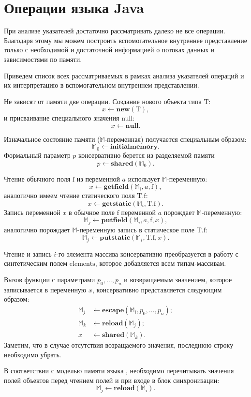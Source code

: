 \documentclass[14pt,titlepage,draft]{extarticle}
\newcommand{\java}{\eng{Java}\xspace}
\newcommand{\M}{\mathbb{M}}
\newcommand{\Mhyp}{$\M$\hyp}
\newcommand{\type}[1]{\mathrm{#1}}
\newcommand{\field}[1]{\mathrm{#1}}
\newcommand{\sfield}[2]{\type{#1}.\field{#2}}
\newcommand{\op}[1]{\mathbf{#1}}
\begin{document}
  \section{Операции языка Java}

    При анализе указателей достаточно рассматривать далеко не все операции.
    Благодаря этому мы можем построить вспомогательное внутреннее представление
    только с необходимой и достаточной информацией о потоках данных и
    зависимостями по памяти.

    Приведем список всех рассматриваемых в рамках анализа указателей операций и
    их интерпретацию в вспомогательном внутреннем представлении.

    Не зависят от памяти две операции. Создание нового объекта типа $\type{T}$:
    \[ x \gets \op{new}(\type{T}), \]
    и присваивание специального значения null:
    \[ x \gets \op{null}. \]

    Изначальное состояние памяти (\Mhyp переменная) получается специальным
    образом:
    \[ \M_0 \gets \op{initialmemory}. \]
    Формальный параметр $p$ консервативно берется из разделяемой памяти
    \[ p \gets \op{shared}(\M_0). \]

    Чтение обычного поля $\field{f}$ из переменной $a$ использует
    \Mhyp переменную:
    \[ x \gets \op{getfield}(\M_i, a, \field{f}), \]
    аналогично имеем чтение статического поля $\sfield{T}{f}$:
    \[ x \gets \op{getstatic}(\M_i, \sfield{T}{f}). \]
    Запись переменной $x$ в обычное поле $\field{f}$ переменной $a$ порождает
    \Mhyp переменную:
    \[ \M_j \gets \op{putfield}(\M_i, a, \field{f}, x), \]
    аналогично порождает \Mhyp переменную запись в статическое поле
    $\sfield{T}{f}$:
    \[ \M_j \gets \op{putstatic}(\M_i, \sfield{T}{f}, x). \]

    Чтение и запись $i$-го элемента массива консервативно преобразуется в
    работу с синтетическим полем $\field{elements}$, которое добавляется всем
    типам\hyp{}массивам.

    Вызов функции с параметрами $p_0, \ldots, p_n$ и возвращаемым значением,
    которое записывается в переменную $x$, консервативно представляется
    следующим образом:
    \[\begin{aligned}
      \M_j &\gets \op{escape}(\M_i, p_0, \ldots, p_n); \\
      \M_k &\gets \op{reload}(\M_j); \\
      x  &\gets \op{shared}(\M_k).
    \end{aligned}\]
    Заметим, что в случае отсутствия возращаемого значения, последнюю строку
    необходимо убрать.

    В соответствии с моделью памяти языка \java, необходимо перечитывать
    значения полей объектов перед чтением  полей и при входе в
    блок синхронизации:
    \[ \M_j \gets \op{reload}(\M_i). \]


  \newpage
  
\end{document}

